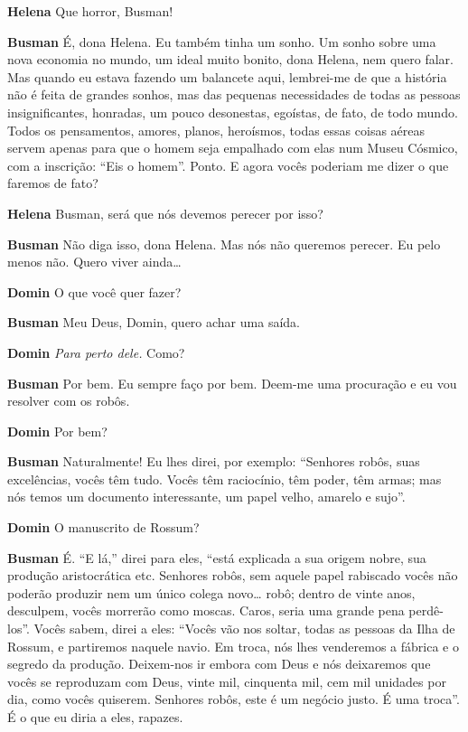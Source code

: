 \textbf{Helena} Que horror, Busman!

\textbf{Busman} É, dona Helena. Eu também tinha um sonho. Um sonho sobre uma nova 
economia no mundo, um ideal muito bonito, dona Helena, nem quero
falar. Mas quando eu estava fazendo um balancete aqui, lembrei-me de que a história
não é feita de grandes sonhos, mas das pequenas necessidades de todas as pessoas
insignificantes, honradas, um pouco desonestas, egoístas, de fato, de todo
mundo. Todos os pensamentos, amores, planos, heroísmos, todas essas coisas
aéreas servem apenas para que o homem seja empalhado com elas num Museu Cósmico,
com a inscrição: ``Eis o homem''. Ponto. E agora vocês poderiam me dizer o que 
faremos de fato?

\textbf{Helena} Busman, será que nós devemos perecer por isso?

\textbf{Busman} Não diga isso, dona Helena. Mas nós não queremos perecer. Eu pelo menos
não. Quero viver ainda\ldots{}

\textbf{Domin} O que você quer fazer?

\textbf{Busman} Meu Deus, Domin, quero achar uma saída.

\textbf{Domin} \emph{Para perto dele.} Como?

\textbf{Busman} Por bem. Eu sempre faço por bem. Deem-me uma procuração e eu vou
resolver com os robôs.

\textbf{Domin} Por bem?

\textbf{Busman} Naturalmente! Eu lhes direi, por exemplo: ``Senhores robôs, suas
excelências, vocês têm tudo. Vocês têm raciocínio, têm poder, têm armas; mas nós
temos um documento interessante, um papel velho, amarelo e sujo''.

\textbf{Domin} O manuscrito de Rossum?

\textbf{Busman} É. ``E lá,'' direi para eles, ``está explicada a sua origem nobre, sua
produção aristocrática etc. Senhores robôs, sem aquele papel rabiscado vocês
não poderão produzir nem um único colega novo\ldots{} robô; dentro de vinte anos,
desculpem, vocês morrerão como moscas. Caros, seria uma grande pena
perdê-los''. Vocês sabem, direi a eles: ``Vocês vão nos soltar, todas as pessoas da
Ilha de Rossum, e partiremos naquele navio. Em troca, nós lhes venderemos a
fábrica e o segredo da produção. Deixem-nos ir embora com Deus e nós 
deixaremos que vocês se reproduzam com Deus, vinte mil, cinquenta mil, cem mil unidades por
dia, como vocês quiserem. Senhores robôs, este é um negócio justo. É uma
troca''. É o que eu diria a eles, rapazes.

